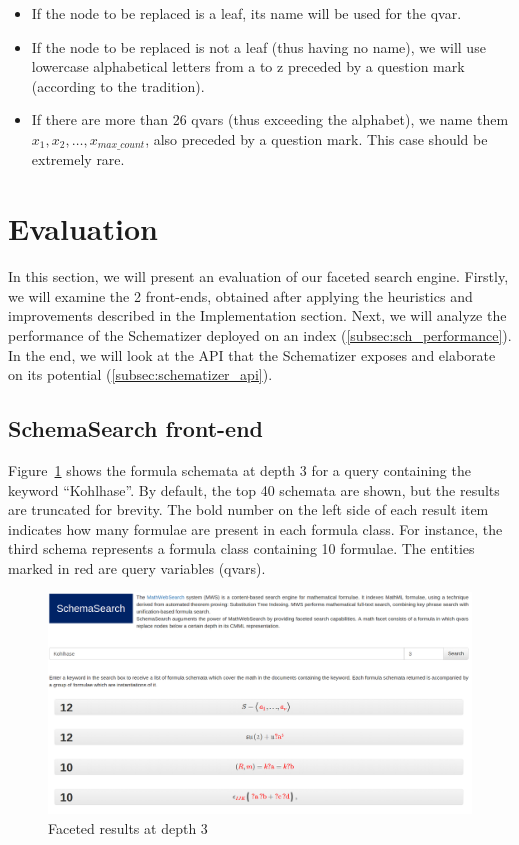 \begin{itemize}
    \item If the node to be replaced is a leaf, its name will be used for the
        qvar.
    \item If the node to be replaced is not a leaf (thus having no name), we
        will use lowercase alphabetical letters from \textsf{a} to \textsf{z}
        preceded by a question mark (according to the \MWS tradition).
    \item If there are more than 26 qvars (thus exceeding the alphabet), we
        name them $x_{1}, x_{2}, \ldots, x_{max\_count}$, also preceded by a
        question mark. This case should be extremely rare.
\end{itemize}

\section{Evaluation}\label{sec:evaluation}

In this section, we will present an evaluation of our faceted search engine.
Firstly, we will examine the 2 front-ends, obtained after applying the
heuristics and improvements described in the Implementation section. Next, we
will analyze the performance of the Schematizer deployed on an \arxiv index
(\ref{subsec:sch_performance}). In the end, we will look at the API that the
Schematizer exposes and elaborate on its potential
(\ref{subsec:schematizer_api}).

\subsection{SchemaSearch front-end}\label{subsec:fe_results_display1}
Figure~\ref{fig:schemata_group} shows the formula schemata at depth 3 for a
query containing the keyword ``Kohlhase''. By default, the top 40 schemata are
shown, but the results are truncated for brevity.
The bold number on the left side of each result item indicates how many
formulae are present in each formula class. For instance, the third schema
represents a formula class containing 10 formulae. The entities marked in red
are query variables (qvars).

\begin{figure}[ht]\centering
    \includegraphics[width=12.8cm]{img/schemataGroup.png}
    \caption{Faceted results at depth 3}\label{fig:schemata_group}
\end{figure}
\FloatBarrier

